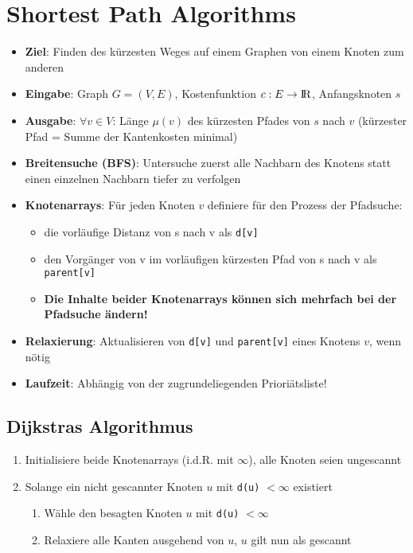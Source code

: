 \section{Shortest Path Algorithms}%
\label{sp:sec:shortest_path_algorithms}

\begin{itemize}
	\item \textbf{Ziel}: Finden des kürzesten Weges auf einem Graphen von einem Knoten zum anderen
	\item \textbf{Eingabe}: Graph $G = (V,E)$, Kostenfunktion $c: E \rightarrow {\rm I\!R}$, Anfangsknoten $s$
	\item \textbf{Ausgabe}: $\forall v \in V$: Länge $\mu(v)$ des kürzesten Pfades von $s$ nach $v$ (kürzester Pfad = Summe der Kantenkosten minimal)
	\item \textbf{Breitensuche (BFS)}: Untersuche zuerst alle Nachbarn des Knotens statt einen einzelnen Nachbarn tiefer zu verfolgen
	\item \textbf{Knotenarrays}: Für jeden Knoten $v$ definiere für den Prozess der Pfadsuche:
	\begin{itemize}
		\item die vorläufige Distanz von s nach v als \texttt{d[v]}
		\item den Vorgänger von v im vorläufigen kürzesten Pfad von s nach v als \texttt{parent[v]}
		\item \textbf{Die Inhalte beider Knotenarrays können sich mehrfach bei der Pfadsuche ändern!}
	\end{itemize}
	\item \textbf{Relaxierung}: Aktualisieren von \texttt{d[v]} und \texttt{parent[v]} eines Knotens $v$, wenn nötig
	\item \textbf{Laufzeit}: Abhängig von der zugrundeliegenden Prioriätsliste!
\end{itemize}

\subsection{Dijkstras Algorithmus}%
\label{sp:sub:dijkstras_algorithmus}

\begin{enumerate}
	\item Initialisiere beide Knotenarrays (i.d.R. mit $\infty$), alle Knoten seien ungescannt
	\item Solange ein nicht gescannter Knoten $u$ mit \texttt{d(u)} $< \infty$ existiert
	\begin{enumerate}
		\item Wähle den besagten Knoten $u$ mit \texttt{d(u)} $< \infty$
		\item Relaxiere alle Kanten ausgehend von $u$, $u$ gilt nun als gescannt
	\end{enumerate}
\end{enumerate}

